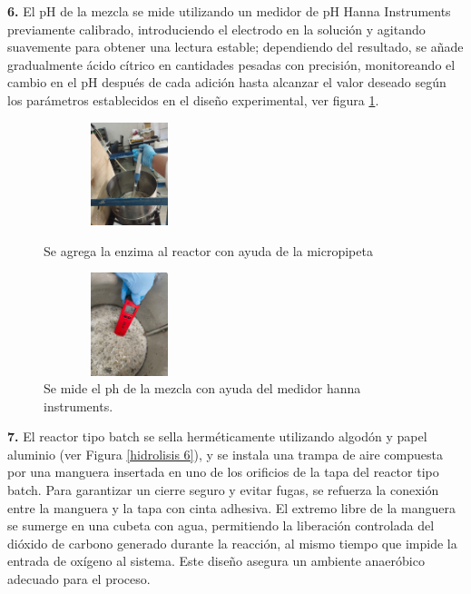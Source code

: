 \documentclass[12pt]{article}
\begin{document}
	     	 
	     \textbf{6.} El pH de la mezcla se mide utilizando un medidor de pH Hanna Instruments previamente calibrado, introduciendo el electrodo en la solución y agitando suavemente para obtener una lectura estable; dependiendo del resultado, se añade gradualmente ácido cítrico en cantidades pesadas con precisión, monitoreando el cambio en el pH después de cada adición hasta alcanzar el valor deseado según los parámetros establecidos en el diseño experimental, ver figura \ref{hidrolisis3}.
	     
	     
	     
	     \begin{figure}[H]
	     	\centering
	     	\begin{minipage}{0.46\textwidth}
	     		\centering
	     		\includegraphics[width=5cm, height=3cm]{imagenes/hidrolisis9} %
	     		\caption{ Se agrega la enzima al reactor con ayuda de la micropipeta }
	     		\label{hidrolisis9}
	     	\end{minipage}
	     	\hfill
	     	\begin{minipage}{0.48\textwidth}
	     		\centering
	     		\includegraphics[width=5cm, height=3cm]{imagenes/hidrolisis3 } %
	     		\caption{ Se mide el ph de la mezcla con ayuda del medidor hanna instruments.}
	     		\label{hidrolisis3}
	     	\end{minipage}
	     \end{figure}
	     
	      \textbf{7.} El reactor tipo batch se sella herméticamente utilizando algodón y papel aluminio (ver Figura \ref{hidrolisis 6}), y se instala una trampa de aire compuesta por una manguera insertada en uno de los orificios de la tapa del reactor tipo batch. Para garantizar un cierre seguro y evitar fugas, se refuerza la conexión entre la manguera y la tapa con cinta adhesiva. El extremo libre de la manguera se sumerge en una cubeta con agua, permitiendo la liberación controlada del dióxido de carbono generado durante la reacción, al mismo tiempo que impide la entrada de oxígeno al sistema. Este diseño asegura un ambiente anaeróbico adecuado para el proceso.
	
\end{document}
